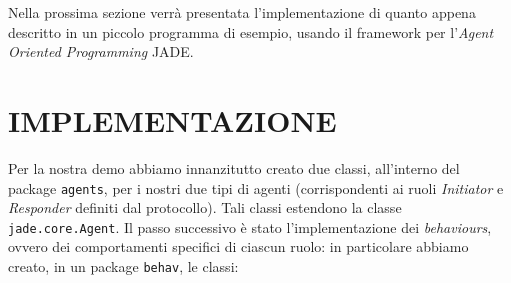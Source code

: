 \documentclass[a4paper, 10pt, conference]{ieeeconf} %
\begin{document}
Nella prossima sezione verrà presentata l'implementazione di quanto appena descritto in un piccolo programma di esempio, usando il framework per l'\emph{Agent Oriented Programming} JADE.

\addtolength{\textheight}{-9.9cm} %

\section{IMPLEMENTAZIONE} \label{s2}
Per la nostra demo abbiamo innanzitutto creato due classi, all'interno del package \texttt{agents}, per i nostri due tipi di agenti (corrispondenti ai ruoli \emph{Initiator} e \emph{Responder} definiti dal protocollo). Tali classi estendono la classe \texttt{jade.core.Agent}.
Il passo successivo è stato l'implementazione dei \emph{behaviours}, ovvero dei comportamenti specifici di ciascun ruolo: in particolare abbiamo creato, in un package \texttt{behav}, le classi:
\end{document}
